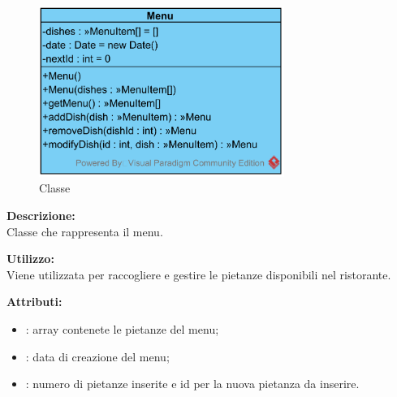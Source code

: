 \paragraph[::Menu]{\class}\mbox{}\\ \label{\class}
\begin{figure}[H]
	\centering
	\includegraphics[width=8cm]{./diagrammi/demo/server/menu.png}
	\caption{Classe \class}
\end{figure}
\textbf{Descrizione:}\\
Classe che rappresenta il menu.

\textbf{Utilizzo:}\\
Viene utilizzata per raccogliere e gestire le pietanze disponibili nel ristorante.

%

\textbf{Attributi:}
\begin{itemize}
	\item {}: array contenete le pietanze del menu;
	\item {}: data di creazione del menu;
	\item {}: numero di pietanze inserite e id per la nuova pietanza da inserire.
\end{itemize}

